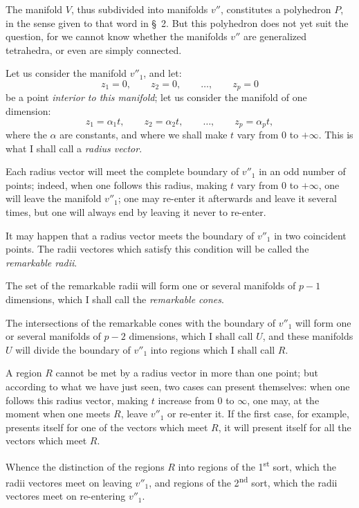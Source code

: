 \documentclass{article}
\begin{document}
The manifold $V$, thus subdivided into manifolds $v''$, constitutes a polyhedron $P$, in the sense given to that word in \S~2. But this polyhedron does not yet suit the question, for we cannot know whether the manifolds $v''$ are generalized tetrahedra, or even are simply connected.

Let us consider the manifold $v''_{1}$, and let:
\[ z_{1} = 0, \qquad z_{2} = 0, \qquad \ldots, \qquad z_{p} = 0 \]
be a point \emph{interior to this manifold}; let us consider the manifold of one dimension:
\[ z_{1} = \alpha_{1} t, \qquad z_{2} = \alpha_{2} t, \qquad \ldots, \qquad z_{p} = \alpha_{p} t, \]
where the $\alpha$ are constants, and where we shall make $t$ vary from 0 to $+\infty$. This is what I shall call a \emph{radius vector}.

Each radius vector will meet the complete boundary of $v''_{1}$ in an odd number of points; indeed, when one follows this radius, making
$t$ vary from 0 to $+\infty$, one will leave the manifold $v''_{1}$; one may re-enter it afterwards and leave it several times, but one will always end by leaving it never to re-enter.

It may happen that a radius vector meets the boundary of $v''_{1}$ in two coincident points. The radii vectores which satisfy this condition will be called the \emph{remarkable radii}.

The set of the remarkable radii will form one or several manifolds of $p - 1$ dimensions, which I shall call the \emph{remarkable cones}.

The intersections of the remarkable cones with the boundary of $v''_{1}$ will form one or several manifolds of $p - 2$ dimensions, which I shall call $U$, and these manifolds $U$ will divide the boundary of $v''_{1}$ into regions which I shall call $R$.

A region $R$ cannot be met by a radius vector in more than one point; but according to what we have just seen, two cases can present themselves: when one follows this radius vector, making $t$ increase from 0 to $\infty$, one may, at the moment when one meets $R$, leave $v''_{1}$ or re-enter it. If the first case, for example, presents itself for one of the vectors which meet $R$, it will present itself for all the vectors which meet $R$.

Whence the distinction of the regions $R$ into regions of the 1\textsuperscript{st} sort, which the radii vectores meet on leaving $v''_{1}$, and regions of the 2\textsuperscript{nd} sort, which the radii vectores meet on re-entering $v''_{1}$.
\end{document}
